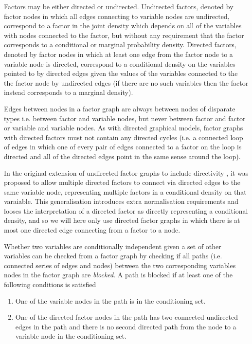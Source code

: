 Factors may be either directed or undirected. Undirected factors, denoted by factor nodes in which all edges connecting to variable nodes are undirected, correspond to a factor in the joint density which depends on all of the variables with nodes connected to the factor, but without any requirement that the factor corresponds to a conditional or marginal probability density. Directed factors, denoted by factor nodes in which at least one edge from the factor node to a variable node is directed, correspond to a conditional density on the variables pointed to by directed edges given the values of the variables connected to the the factor node by undirected edges (if there are no such variables then the factor instead corresponds to a marginal density).

Edges between nodes in a factor graph are always between nodes of disparate types i.e. between factor and variable nodes, but never between factor and factor or variable and variable nodes. As with directed graphical models, factor graphs with directed factors must not contain any directed cycles (i.e. a connected loop of edges in which one of every pair of edges connected to a factor on the loop is directed and all of the directed edges point in the same sense around the loop). 

In the original extension of undirected factor graphs \citep{frey1997factor} to include directivity \citep{frey2002extending}, it was proposed to allow multiple directed factors to connect via directed edges to the same variable node, representing multiple factors in a conditional density on that varaiable. This generalisation introduces extra normalisation requirements and looses the interpretation of a directed factor as directly representing a conditional density, and so we will here only use directed factor graphs in which there is at most one directed edge connecting from a factor to a node.

Whether two variables are conditionally independent given a set of other variables can be checked from a factor graph by checking if all paths (i.e. connected series of edges and nodes) between the two corresponding variables nodes in the factor graph are \emph{blocked}. A path is blocked if at least one of the following conditions is satisfied \citep{frey2002extending}
\begin{enumerate}
  \item One of the variable nodes in the path is in the conditioning set.
  \item One of the directed factor nodes in the path has two connected undirected edges in the path and there is no second directed path from the node to a variable node in the conditioning set.
\end{enumerate}

